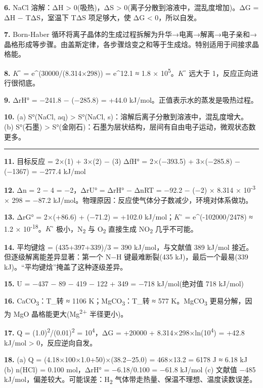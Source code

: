 \documentclass[a4paper,11pt]{ctexart}
\begin{document}
\textbf{6.} NaCl 溶解：ΔH \textgreater{} 0(吸热)，ΔS \textgreater{} 0(离子分散到溶液中，混乱度增加)。ΔG = ΔH − TΔS，室温下 TΔS 项足够大，使 ΔG \textless{} 0，所以自发。

\textbf{7.} Born-Haber 循环将离子晶体的生成过程拆解为升华→电离→解离→电子亲和→晶格形成等步骤。由盖斯定律，各步骤焓变之和等于生成焓。特别适用于间接求晶格能。

\textbf{8.} \(K^{\circ}\) = e\^{}(30000/(8.314×298)) = e\^{}12.1 ≈ 1.8 × 10\textsuperscript{5}。\(K^{\circ}\) 远大于 1，反应正向进行很彻底。

\textbf{9.} ΔrH° = −241.8 − (−285.8) = +44.0 kJ/mol。正值表示水的蒸发是吸热过程。

\textbf{10.}
(a) S°(NaCl, aq) \textgreater{} S°(NaCl, s)：溶解后离子分散到溶液中，混乱度增大。
(b) S°(石墨) \textgreater{} S°(金刚石)：石墨为层状结构，层间有自由电子运动，微观状态数更多。

\begin{center}\rule{0.5\linewidth}{0.5pt}\end{center}

\textbf{11.} 目标反应 = 2×(1) + 3×(2) − (3)
ΔfH° = 2×(−393.5) + 3×(−285.8) − (−1367) = −277.4 kJ/mol

\textbf{12.} Δn = 2 − 4 = −2，ΔrU° = ΔrH° − ΔnRT = −92.2 − (−2) × 8.314 × 10\textsuperscript{-3} × 298 = −87.2 kJ/mol。物理原因：反应使气体分子数减少，环境对体系做功。

\textbf{13.} ΔrG° = 2×(+86.6) + (−71.2) = +102.0 kJ/mol；\(K^{\circ}\) = e\^{}(-102000/2478) ≈ 1.2 × 10\textsuperscript{-18}。\(K^{\circ}\) 极小，N\textsubscript{2} 与 O\textsubscript{2} 直接生成 NO\textsubscript{2} 几乎不可能。

\textbf{14.} 平均键焓 = (435+397+339)/3 = 390 kJ/mol，与文献值 389 kJ/mol 接近。但逐级解离能差异显著：第一个 N−H 键最难断裂(435 kJ)，最后一个最易(339 kJ)。``平均键焓''掩盖了这种逐级差异。

\textbf{15.} U = −437 − 89 − 419 − 122 + 349 = −718 kJ/mol(绝对值 718 kJ/mol)

\textbf{16.} CaCO\textsubscript{3}：T\_转 ≈ 1106 K；MgCO\textsubscript{3}：T\_转 ≈ 577 K。MgCO\textsubscript{3} 更易分解，因为 MgO 晶格能更大(Mg\textsuperscript{2+} 半径更小)。

\textbf{17.} Q = (1.0)\textsuperscript{2}/(0.01)\textsuperscript{2} = 10\textsuperscript{4}，ΔG = +20000 + 8.314×298×ln(10\textsuperscript{4}) = +42.8 kJ/mol \textgreater{} 0，反应逆向自发。

\textbf{18.}
(a) Q = (4.18×100×1.0+50)×(38.2−25.0) = 468×13.2 = 6178 J ≈ 6.18 kJ
(b) n(HCl) = 0.100 mol，ΔrH° = −6.18/0.100 = −61.8 kJ/mol
(c) 文献值 −485 kJ/mol，偏差较大。可能误差：H\textsubscript{2} 气体带走热量、保温不理想、温度读数误差。
\end{document}
